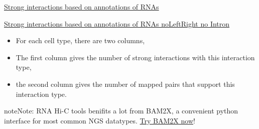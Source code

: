 \documentclass[letterpaper,10pt,english]{sphinxmanual}
\begin{document}
\href{http://systemsbio.ucsd.edu/RNA-Hi-C/Data/Count\_types\_interaction\_fragment\_wholeRNA.htm}{Strong interactions based on annotations of RNAs}

\href{http://systemsbio.ucsd.edu/RNA-Hi-C/Data/Count\_types\_interaction\_fragment\_wholeRNA\_noLeftRight.htm}{Strong interactions based on annotations of RNAs noLeftRight no Intron}
\begin{itemize}
\item {} 
For each cell type, there are two columns,

\item {} 
The first column gives the number of strong interactions with this interaction type,

\item {} 
the second column gives the number of mapped pairs that support this interaction type.

\end{itemize}

\begin{notice}{note}{Note:}
RNA Hi-C tools benifits a lot from BAM2X, a convenient python interface for most common NGS datatypes. \href{http://www.bam2x.net/}{Try BAM2X now}!
\end{notice}
\end{document}
